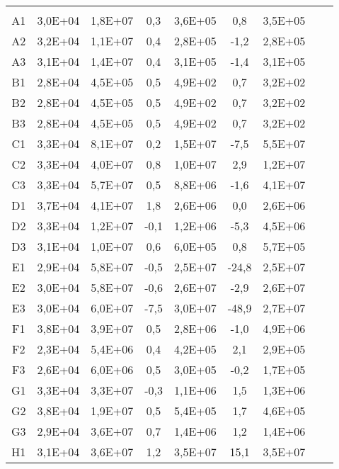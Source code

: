\begin{center}
\begin{longtable}{ccccccccc}
\toprule
\endhead
\midrule \\ %
\endfoot
\bottomrule 
\endlastfoot
    A1    & 3,0E+04 & 1,8E+07 & 0,3   & 3,6E+05 & 0,8   & 3,5E+05 \\
    A2    & 3,2E+04 & 1,1E+07 & 0,4   & 2,8E+05 & -1,2  & 2,8E+05 \\
    A3    & 3,1E+04 & 1,4E+07 & 0,4   & 3,1E+05 & -1,4  & 3,1E+05 \\
    B1    & 2,8E+04 & 4,5E+05 & 0,5   & 4,9E+02 & 0,7   & 3,2E+02 \\
    B2    & 2,8E+04 & 4,5E+05 & 0,5   & 4,9E+02 & 0,7   & 3,2E+02 \\
    B3    & 2,8E+04 & 4,5E+05 & 0,5   & 4,9E+02 & 0,7   & 3,2E+02 \\
    C1    & 3,3E+04 & 8,1E+07 & 0,2   & 1,5E+07 & -7,5  & 5,5E+07 \\
    C2    & 3,3E+04 & 4,0E+07 & 0,8   & 1,0E+07 & 2,9   & 1,2E+07 \\
    C3    & 3,3E+04 & 5,7E+07 & 0,5   & 8,8E+06 & -1,6  & 4,1E+07 \\
    D1    & 3,7E+04 & 4,1E+07 & 1,8   & 2,6E+06 & 0,0   & 2,6E+06 \\
    D2    & 3,3E+04 & 1,2E+07 & -0,1  & 1,2E+06 & -5,3  & 4,5E+06 \\
    D3    & 3,1E+04 & 1,0E+07 & 0,6   & 6,0E+05 & 0,8   & 5,7E+05 \\
    E1    & 2,9E+04 & 5,8E+07 & -0,5  & 2,5E+07 & -24,8 & 2,5E+07 \\
    E2    & 3,0E+04 & 5,8E+07 & -0,6  & 2,6E+07 & -2,9  & 2,6E+07 \\
    E3    & 3,0E+04 & 6,0E+07 & -7,5  & 3,0E+07 & -48,9 & 2,7E+07 \\
    F1    & 3,8E+04 & 3,9E+07 & 0,5   & 2,8E+06 & -1,0  & 4,9E+06 \\
    F2    & 2,3E+04 & 5,4E+06 & 0,4   & 4,2E+05 & 2,1   & 2,9E+05 \\
    F3    & 2,6E+04 & 6,0E+06 & 0,5   & 3,0E+05 & -0,2  & 1,7E+05 \\
    G1    & 3,3E+04 & 3,3E+07 & -0,3  & 1,1E+06 & 1,5   & 1,3E+06 \\
    G2    & 3,8E+04 & 1,9E+07 & 0,5   & 5,4E+05 & 1,7   & 4,6E+05 \\
    G3    & 2,9E+04 & 3,6E+07 & 0,7   & 1,4E+06 & 1,2   & 1,4E+06 \\
    H1    & 3,1E+04 & 3,6E+07 & 1,2   & 3,5E+07 & 15,1  & 3,5E+07 \\

\end{longtable}
\end{center}
